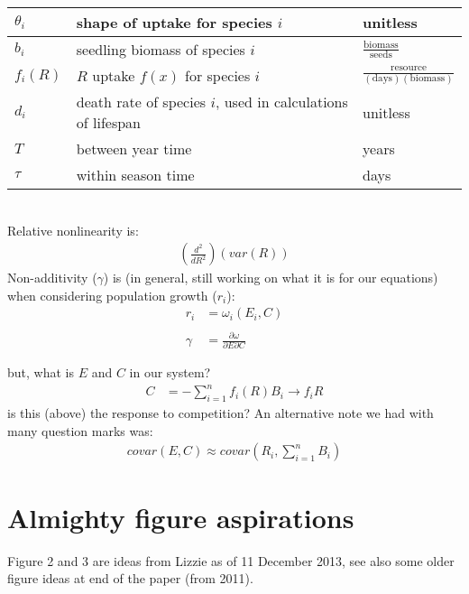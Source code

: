 \documentclass[11pt,a4paper,oneside]{article}
\begin{document}
\begin{center}
\begin{table}[h!]
\begin{tabular}{ | p{3.0cm} | p{6.0cm} | p{4.0cm} |}
\(\theta_{i}\) & shape of uptake for species \(i\) & unitless\\ \hline
\hline
\(b_{i}\) & seedling biomass of species \(i\) & \(\frac{\text{biomass}}{\text{seeds}}\) \\ \hline
\(f_{i}(R)\) & \(R\) uptake \(f(x)\) for species \(i\) & \(\frac{\text{resource}}{(\text{days})(\text{biomass})}\)\\ \hline
\(d_{i}\) & death rate of species \(i\), used in calculations of lifespan & unitless \\ \hline
\(T\) & between year time & years \\ \hline
\(\tau\) & within season time & days \\ \hline
\hline
\end{tabular}
\end{table}
\end{center}


\newpage
{}\\
\noindent Relative nonlinearity is:
\begin{align*}
\left(\frac{d^{2}}{dR^{2}}\right)(var(R))
\end{align*}
\noindent Non-additivity (\(\gamma\)) is (in general, still working on
what it is for our equations) when considering population growth
(\(r_{i}\)):
\begin{align*}
r_{i} & = \omega_{i}(E_{i}, C)
\\
\\
\gamma & = \frac{\partial \omega}{\partial E \partial C} 
\end{align*}

\noindent but, what is \(E\) and \(C\) in our system?
\begin{align*}
C & = - \sum_{i=1}^{n}f_{i}(R)B_{i} \rightarrow f_{i}R
\end{align*}
\noindent is this (above) the response to
  competition? An alternative note we had with many question marks
  was:
\begin{align*}
covar(E,C) \approx covar\left(R_{i}, \sum_{i=1}^{n}B_{i}\right)
\end{align*}

\newpage



\newpage
\section{Almighty figure aspirations} 
\noindent Figure 2 and 3 are ideas from Lizzie as of 11 December 2013, see also some older figure ideas at end of the paper (from 2011). 
\end{document}
